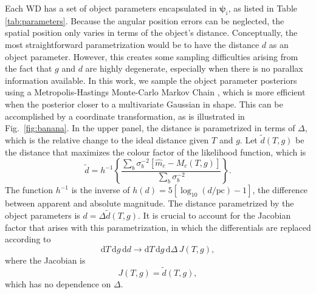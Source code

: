 \documentclass[fleqn,usenatbib]{mnras}
\newcommand{\objp}{\boldsymbol{\psi}}
\newcommand{\Teff}{T}
\newcommand{\logg}{g}
\newcommand{\de}{\text{d}}
\begin{document}
Each WD has a set of object parameters encapsulated in $\objp_i$, as listed in Table \ref{tab:parameters}. Because the angular position errors can be neglected, the spatial position only varies in terms of the object's distance. Conceptually, the most straightforward parametrization would be to have the distance $d$ as an object parameter. However, this creates some sampling difficulties arising from the fact that $\logg$ and $d$ are highly degenerate, especially when there is no parallax information available. In this work, we sample the object parameter posteriors using a Metropolis-Hastings Monte-Carlo Markov Chain \citep{1953JChPh..21.1087M,2018ApJS..236...11H}, which is more efficient when the posterior closer to a multivariate Gaussian in shape. This can be accomplished by a coordinate transformation, as is illustrated in Fig.~\ref{fig:banana}. In the upper panel, the distance is parametrized in terms of $\Delta$, which is the relative change to the ideal distance given $\Teff$ and $\logg$. Let $\tilde{d}(\Teff,\logg)$ be the distance that maximizes the colour factor of the likelihood function, which is
\begin{equation}
	\tilde{d} = 
    h^{-1}\left\{ \frac{\sum_b \sigma_b^{-2} [\hat{m}_c-M_c(\Teff,\logg)]}{\sum_b \sigma_b^{-2}} \right\}.
\end{equation}
The function $h^{-1}$ is the inverse of $h(d)=5[\log_{10}(d/\text{pc})-1]$, the difference between apparent and absolute magnitude. The distance parametrized by the object parameters is $d=\Delta\tilde{d}(\Teff,\logg)$. It is crucial to account for the Jacobian factor that arises with this parametrization, in which the differentials are replaced according to
\begin{equation}
	\de \Teff\, \de \logg\, \de d \rightarrow \de \Teff\, \de \logg\, \de \Delta\, J(\Teff,\logg),
\end{equation}
where the Jacobian is
\begin{equation}
	J(\Teff,\logg) = \tilde{d}(\Teff,\logg),
\end{equation}
which has no dependence on $\Delta$.
\end{document}
